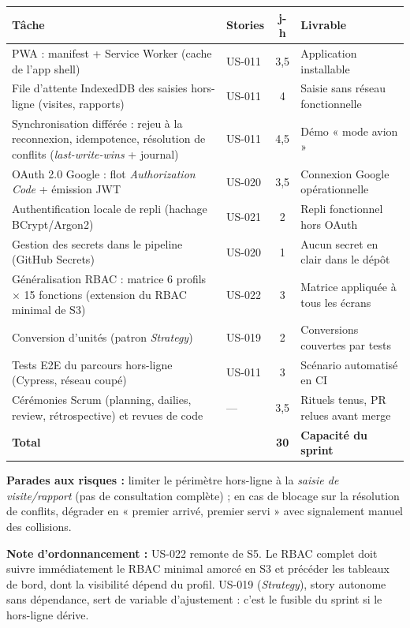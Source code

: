 \begin{center}
\small
\begin{tabular}{p{7.2cm}lcp{4.6cm}}
\toprule
\textbf{Tâche} & \textbf{Stories} & \textbf{j-h} & \textbf{Livrable} \\
\midrule
PWA : manifest + Service Worker (cache de l'app shell) & US-011 & 3,5 & Application installable \\
File d'attente IndexedDB des saisies hors-ligne (visites, rapports) & US-011 & 4 & Saisie sans réseau fonctionnelle \\
Synchronisation différée : rejeu à la reconnexion, idempotence,
résolution de conflits (\emph{last-write-wins} + journal) & US-011 & 4,5 & Démo « mode avion » \\
OAuth 2.0 Google : flot \emph{Authorization Code} + émission JWT & US-020 & 3,5 & Connexion Google opérationnelle \\
Authentification locale de repli (hachage BCrypt/Argon2) & US-021 & 2 & Repli fonctionnel hors OAuth \\
Gestion des secrets dans le pipeline (GitHub Secrets) & US-020 & 1 & Aucun secret en clair dans le dépôt \\
Généralisation RBAC : matrice 6 profils $\times$ 15 fonctions
(extension du RBAC minimal de S3) & US-022 & 3 & Matrice appliquée à tous les écrans \\
Conversion d'unités (patron \emph{Strategy}) & US-019 & 2 & Conversions couvertes par tests \\
Tests E2E du parcours hors-ligne (Cypress, réseau coupé) & US-011 & 3 & Scénario automatisé en CI \\
\addlinespace
Cérémonies Scrum (planning, dailies, review, rétrospective) et
revues de code & --- & 3,5 & Rituels tenus, PR relues avant merge \\
\midrule
\textbf{Total} & & \textbf{30} & \textbf{Capacité du sprint} \\
\bottomrule
\end{tabular}
\end{center}

\textbf{Parades aux risques :} limiter le périmètre hors-ligne à la
\emph{saisie de visite/rapport} (pas de consultation complète) ; en cas de
blocage sur la résolution de conflits, dégrader en « premier arrivé,
premier servi » avec signalement manuel des collisions.

\textbf{Note d'ordonnancement :} US-022 remonte de S5. Le RBAC complet doit
suivre immédiatement le RBAC minimal amorcé en S3 et précéder les tableaux
de bord, dont la visibilité dépend du profil. US-019 (\emph{Strategy}),
story autonome sans dépendance, sert de variable d'ajustement : c'est le
fusible du sprint si le hors-ligne dérive.

